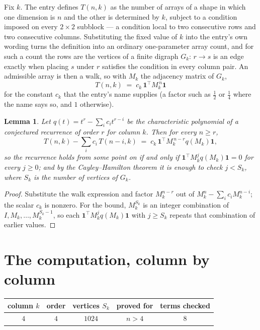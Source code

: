 \documentclass[11pt,a4paper]{article}
\theoremstyle{plain}
\newtheorem{lemma}[theorem]{Lemma}
\theoremstyle{definition}
\begin{document}
Fix $k$. The entry defines $T(n,k)$ as the number of arrays of a shape in which one dimension
is $n$ and the other is determined by $k$, subject to a condition imposed on every
$2\times2$ subblock --- a condition local to two consecutive rows and two consecutive columns.
Substituting the fixed value of $k$ into the entry's own wording turns the definition into an
ordinary one-parameter array count, and for such a count the rows are the vertices of a finite
digraph $G_k$: $r\to s$ is an edge exactly when placing $s$ under $r$ satisfies the condition
in every column pair. An admissible array is then a walk, so with $M_k$ the adjacency matrix
of $G_k$,
\[
T(n,k)\;=\;c_k\,\mathbf{1}^{\!\top}M_k^{\,n}\mathbf{1}
\]
for the constant $c_k$ that the entry's name supplies (a factor such as $\tfrac12$ or
$\tfrac14$ where the name says so, and $1$ otherwise).

\begin{lemma}\label{lem:crit}
Let $q(t)=t^{r}-\sum_i c_it^{r-i}$ be the characteristic polynomial of a conjectured
recurrence of order $r$ for column $k$. Then for every $n\ge r$,
\[
T(n,k)-\sum_i c_i\,T(n-i,k)\;=\;c_k\,\mathbf{1}^{\!\top}M_k^{\,n-r}q(M_k)\mathbf{1},
\]
so the recurrence holds from some point on if and only if
$\mathbf{1}^{\!\top}M_k^{j}q(M_k)\mathbf{1}=0$ for every $j\ge0$; and by the
Cayley--Hamilton theorem it is enough to check $j<S_k$, where $S_k$ is the number of vertices
of $G_k$.
\end{lemma}

\begin{proof}
Substitute the walk expression and factor $M_k^{n-r}$ out of $M_k^{n}-\sum_ic_iM_k^{n-i}$;
the scalar $c_k$ is nonzero. For the bound, $M_k^{S_k}$ is an integer combination of
$I,M_k,\dots,M_k^{S_k-1}$, so each $\mathbf{1}^{\!\top}M_k^{j}q(M_k)\mathbf{1}$ with
$j\ge S_k$ repeats that combination of earlier values.
\end{proof}

\section{The computation, column by column}

\begin{center}
\begin{tabular}{ccccc}
column $k$ & order & vertices $S_k$ & proved for & terms checked \\ \hline
$4$ & $4$ & $1024$ & $n>4$ & $8$ \\
\end{tabular}
\end{center}
\end{document}
